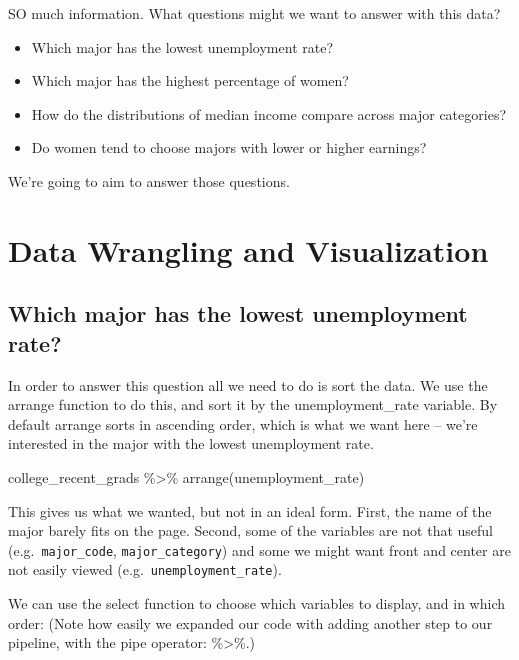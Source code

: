 \documentclass[
]{article}
\newenvironment{Shaded}{\begin{snugshade}}{\end{snugshade}}
\newcommand{\FunctionTok}[1]{\textcolor[rgb]{0.00,0.00,0.00}{#1}}
\newcommand{\NormalTok}[1]{#1}
\newcommand{\SpecialCharTok}[1]{\textcolor[rgb]{0.00,0.00,0.00}{#1}}
\providecommand{\tightlist}{%
  \setlength{\itemsep}{0pt}\setlength{\parskip}{0pt}}
\begin{document}
SO much information. What questions might we want to answer with this
data?

\begin{itemize}
\tightlist
\item
  Which major has the lowest unemployment rate?
\item
  Which major has the highest percentage of women?
\item
  How do the distributions of median income compare across major
  categories?
\item
  Do women tend to choose majors with lower or higher earnings?
\end{itemize}

We're going to aim to answer those questions.

\hypertarget{data-wrangling-and-visualization}{%
\section{Data Wrangling and
Visualization}\label{data-wrangling-and-visualization}}

\hypertarget{which-major-has-the-lowest-unemployment-rate}{%
\subsection{Which major has the lowest unemployment
rate?}\label{which-major-has-the-lowest-unemployment-rate}}

In order to answer this question all we need to do is sort the data. We
use the arrange function to do this, and sort it by the
unemployment\_rate variable. By default arrange sorts in ascending
order, which is what we want here -- we're interested in the major with
the lowest unemployment rate.

\begin{Shaded}
\begin{Highlighting}[]
\NormalTok{college\_recent\_grads }\SpecialCharTok{\%\textgreater{}\%}
  \FunctionTok{arrange}\NormalTok{(unemployment\_rate)}
\end{Highlighting}
\end{Shaded}

This gives us what we wanted, but not in an ideal form. First, the name
of the major barely fits on the page. Second, some of the variables are
not that useful (e.g.~\texttt{major\_code}, \texttt{major\_category})
and some we might want front and center are not easily viewed
(e.g.~\texttt{unemployment\_rate}).

We can use the select function to choose which variables to display, and
in which order: (Note how easily we expanded our code with adding
another step to our pipeline, with the pipe operator: \%\textgreater\%.)
\end{document}
